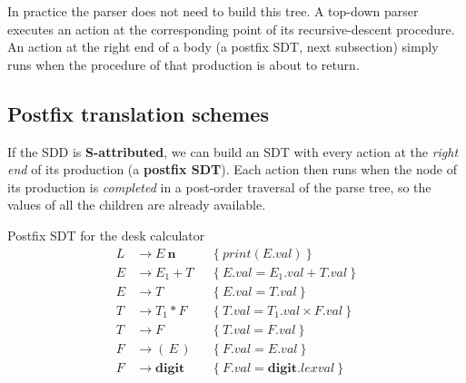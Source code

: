 \documentclass[11pt,a4paper]{article}
\newcommand{\at}[2]{\ensuremath{#1.\mathit{#2}}}
\begin{document}
In practice the parser does not need to build this tree. A top-down parser executes an action at the corresponding point of its recursive-descent procedure. An action at the right end of a body (a postfix SDT, next subsection) simply runs when the procedure of that production is about to return.

\subsection{Postfix translation schemes}
If the SDD is \textbf{S-attributed}, we can build an SDT with every action at the \emph{right end} of its production (a \textbf{postfix SDT}). Each action then runs when the node of its production is \emph{completed} in a post-order traversal of the parse tree, so the values of all the children are already available.

\begin{examplebox}{Postfix SDT for the desk calculator}
\begin{align*}
L &\to E\ \mathbf{n} &&\{\ \mathit{print}(\at{E}{val})\ \}\\
E &\to E_1 + T &&\{\ \at{E}{val} = \at{E_1}{val} + \at{T}{val}\ \}\\
E &\to T &&\{\ \at{E}{val} = \at{T}{val}\ \}\\
T &\to T_1 * F &&\{\ \at{T}{val} = \at{T_1}{val} \times \at{F}{val}\ \}\\
T &\to F &&\{\ \at{T}{val} = \at{F}{val}\ \}\\
F &\to (\,E\,) &&\{\ \at{F}{val} = \at{E}{val}\ \}\\
F &\to \mathbf{digit} &&\{\ \at{F}{val} = \at{\mathbf{digit}}{lexval}\ \}
\end{align*}
\end{examplebox}
\end{document}
